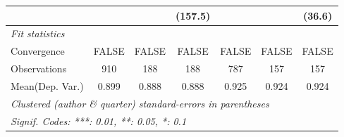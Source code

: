 \begin{tabular}{lcccccc}
                           &         &             & (157.5)   &         &              & (36.6)\\   
   \midrule
   \emph{Fit statistics}\\
   Convergence             &FALSE    & FALSE       & FALSE     & FALSE   & FALSE        & FALSE\\  
   Observations            & 910     & 188         & 188       & 787     & 157          & 157\\  
Mean(Dep. Var.) & 0.899 & 0.888 & 0.888 & 0.925 & 0.924 & 0.924 \\
   \midrule \midrule
   \multicolumn{7}{l}{\emph{Clustered (author \& quarter) standard-errors in parentheses}}\\
   \multicolumn{7}{l}{\emph{Signif. Codes: ***: 0.01, **: 0.05, *: 0.1}}\\
\end{tabular}
\par\endgroup
